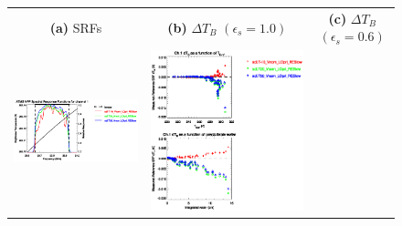 \begin{figure}[H]
  \centering
  \begin{tabular}{c c c}
    \textsf{\textbf{(a)} SRFs} &
    \textsf{\textbf{(b)} $\Delta T_B$ $(\epsilon_s = 1.0)$} &
    \textsf{\textbf{(c)} $\Delta T_B$ $(\epsilon_s = 0.6)$} \\
    \includegraphics[bb=80 400 280 558,clip,scale=0.85]{graphics/srf/Tset/atms_npp.ch1.osrf.eps} &
    \includegraphics[bb=85 400 260 558,clip,scale=0.85]{graphics/dtb/Tset/e1.0_r0.0/atms_npp.ch1.dTb.eps} & 

\end{tabular}
\end{figure}
